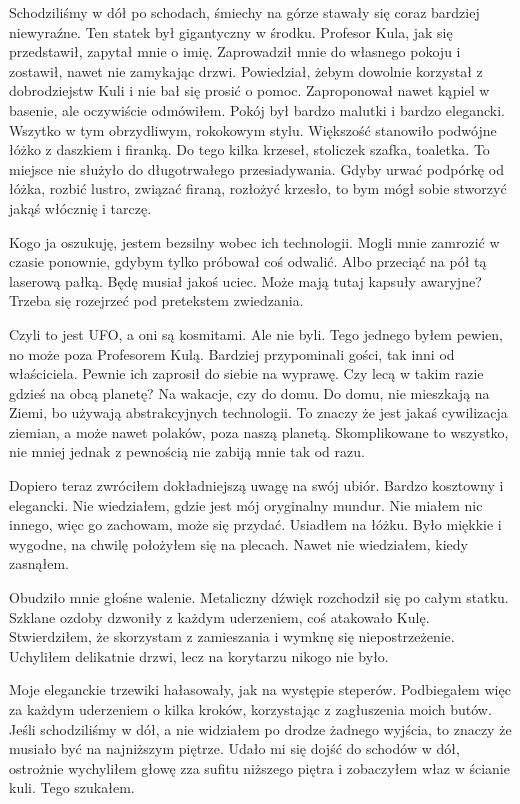 Schodziliśmy w dół po schodach, śmiechy na górze stawały się coraz bardziej niewyraźne.
Ten statek był gigantyczny w środku. Profesor Kula, jak się przedstawił, zapytał mnie o imię.
Zaprowadził mnie do własnego pokoju i zostawił, nawet nie zamykając drzwi. Powiedział, żebym
dowolnie korzystał z dobrodziejstw Kuli i nie bał się prosić o pomoc. Zaproponował nawet kąpiel w basenie, ale oczywiście odmówiłem.
Pokój był bardzo malutki i bardzo elegancki.
Wszytko w tym obrzydliwym, rokokowym stylu.
Większość stanowiło podwójne łóżko z daszkiem i firanką.
Do tego kilka krzeseł, stoliczek szafka, toaletka.
To miejsce nie służyło do długotrwałego przesiadywania.
Gdyby urwać podpórkę od łóżka, rozbić lustro, związać firaną, rozłożyć krzesło, to bym mógł sobie stworzyć jakąś włócznię i tarczę.

Kogo ja oszukuję, jestem bezsilny wobec ich technologii.
Mogli mnie zamrozić w czasie ponownie, gdybym tylko próbował coś odwalić.
Albo przeciąć na pół tą laserową pałką.
Będę musiał jakoś uciec. Może mają tutaj kapsuły awaryjne?
Trzeba się rozejrzeć pod pretekstem zwiedzania.

Czyli to jest UFO, a oni są kosmitami. 
Ale nie byli. Tego jednego byłem pewien, no może poza Profesorem Kulą.
Bardziej przypominali gości, tak inni od właściciela. Pewnie ich zaprosił do siebie na wyprawę.
Czy lecą w takim razie gdzieś na obcą planetę?
Na wakacje, czy do domu.
Do domu, nie mieszkają na Ziemi, bo używają abstrakcyjnych technologii.
To znaczy że jest jakaś cywilizacja ziemian, a może nawet polaków, poza naszą planetą.
Skomplikowane to wszystko, nie mniej jednak z pewnością nie zabiją mnie tak od razu.

Dopiero teraz zwróciłem dokładniejszą uwagę na swój ubiór.
Bardzo kosztowny i elegancki. Nie wiedziałem, gdzie jest mój oryginalny mundur. Nie miałem nic innego, więc go zachowam, może się przydać.
Usiadłem na łóżku. Było miękkie i wygodne, na chwilę położyłem się na plecach.
Nawet nie wiedziałem, kiedy zasnąłem.

Obudziło mnie głośne walenie. Metaliczny dźwięk rozchodził się po całym statku.
Szklane ozdoby dzwoniły z każdym uderzeniem, coś atakowało Kulę.
Stwierdziłem, że skorzystam z zamieszania i wymknę się niepostrzeżenie.
Uchyliłem delikatnie drzwi, lecz na korytarzu nikogo nie było.

Moje eleganckie trzewiki hałasowały, jak na występie steperów. 
Podbiegałem więc za każdym uderzeniem o kilka kroków, korzystając z zagłuszenia moich butów.
Jeśli schodziliśmy w dół, a nie widziałem po drodze żadnego wyjścia, to znaczy że musiało być na najniższym piętrze.
Udało mi się dojść do schodów w dół, ostrożnie wychyliłem głowę zza sufitu niższego piętra i zobaczyłem właz w ścianie kuli.
Tego szukałem.

